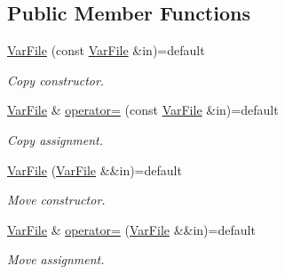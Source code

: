 \subsection*{Public Member Functions}
\begin{DoxyCompactItemize}
\item 
\mbox{\label{classsamp_files_1_1_var_file_a3b56b6b43c1c0e1bbabce28678766032}} 
\hyperlink{classsamp_files_1_1_var_file_a3b56b6b43c1c0e1bbabce28678766032}{Var\+File} (const \hyperlink{classsamp_files_1_1_var_file}{Var\+File} \&in)=default
\begin{DoxyCompactList}\small\item\em Copy constructor. \end{DoxyCompactList}\item 
\mbox{\label{classsamp_files_1_1_var_file_aaa9f31f35e3759ecf3e9722e06bd629c}} 
\hyperlink{classsamp_files_1_1_var_file}{Var\+File} \& \hyperlink{classsamp_files_1_1_var_file_aaa9f31f35e3759ecf3e9722e06bd629c}{operator=} (const \hyperlink{classsamp_files_1_1_var_file}{Var\+File} \&in)=default
\begin{DoxyCompactList}\small\item\em Copy assignment. \end{DoxyCompactList}\item 
\mbox{\label{classsamp_files_1_1_var_file_aeaa0b7b21c4d4638c1694aec00ca88f5}} 
\hyperlink{classsamp_files_1_1_var_file_aeaa0b7b21c4d4638c1694aec00ca88f5}{Var\+File} (\hyperlink{classsamp_files_1_1_var_file}{Var\+File} \&\&in)=default
\begin{DoxyCompactList}\small\item\em Move constructor. \end{DoxyCompactList}\item 
\mbox{\label{classsamp_files_1_1_var_file_a564c81cd0c3e0c3d1124c791ad91ec58}} 
\hyperlink{classsamp_files_1_1_var_file}{Var\+File} \& \hyperlink{classsamp_files_1_1_var_file_a564c81cd0c3e0c3d1124c791ad91ec58}{operator=} (\hyperlink{classsamp_files_1_1_var_file}{Var\+File} \&\&in)=default
\begin{DoxyCompactList}\small\item\em Move assignment. \end{DoxyCompactList}\item 

\end{DoxyCompactItemize}
